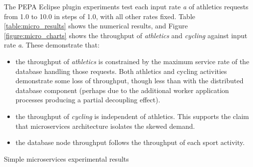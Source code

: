 The PEPA Eclipse plugin experiments test each input rate {\itshape a} of athletics requests from 1.0 to 10.0 in steps of 1.0, with all other rates fixed.  Table \ref{table:micro_results} shows the numerical results, and Figure \ref{figure:micro_charts} shows the throughput of {\itshape athletics} and {\itshape cycling} against input rate {\itshape a}.
These demonstrate that:
\begin{itemize}
	\item the throughput of {\itshape athletics} is constrained by the maximum service rate of the database handling those requests. Both athletics and cycling activities demonstrate some loss of throughput, though less than with the distributed database component (perhaps due to the additional worker application processes producing a partial decoupling effect).
	\item the throughput of {\itshape cycling} is independent of athletics.  This supports the claim that microservices architecture isolates the skewed demand.
	\item the database node throughput follows the throughput of each sport activity.
\end{itemize}

\begin{table}[h!]
	\begin{center}
		\caption{Simple microservices experimental results}
		\label{table:micro_results}
	\end{center}
\end{table}


